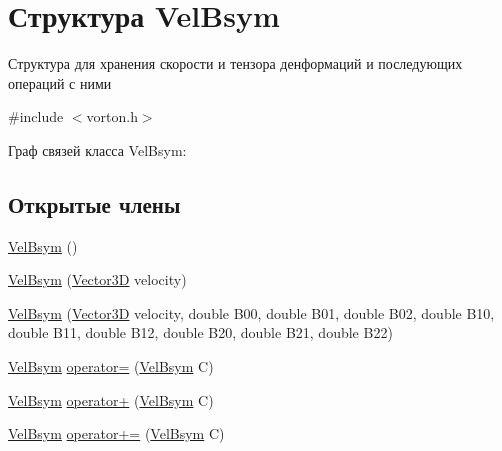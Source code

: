 \hypertarget{struct_vel_bsym}{}\section{Структура Vel\+Bsym}
\label{struct_vel_bsym}


Структура для хранения скорости и тензора денформаций и последующих операций с ними  




{\ttfamily \#include $<$vorton.\+h$>$}



Граф связей класса Vel\+Bsym\+:
\subsection*{Открытые члены}
\begin{DoxyCompactItemize}
\item 
\mbox{\hyperlink{struct_vel_bsym_ab6d789ff036824176fd982ec3650d762}{Vel\+Bsym}} ()
\item 
\mbox{\hyperlink{struct_vel_bsym_ade5b269a7530d543b14c273249cff251}{Vel\+Bsym}} (\mbox{\hyperlink{class_vector3_d}{Vector3D}} velocity)
\item 
\mbox{\hyperlink{struct_vel_bsym_a9d1a6ce0827c575a9bb137a0ffd8fc20}{Vel\+Bsym}} (\mbox{\hyperlink{class_vector3_d}{Vector3D}} velocity, double B00, double B01, double B02, double B10, double B11, double B12, double B20, double B21, double B22)
\item 
\mbox{\hyperlink{struct_vel_bsym}{Vel\+Bsym}} \mbox{\hyperlink{struct_vel_bsym_aad5b2c52f958cbb6457564d654e17566}{operator=}} (\mbox{\hyperlink{struct_vel_bsym}{Vel\+Bsym}} C)
\item 
\mbox{\hyperlink{struct_vel_bsym}{Vel\+Bsym}} \mbox{\hyperlink{struct_vel_bsym_a4751cccf35691a5793f7b181a047b1c3}{operator+}} (\mbox{\hyperlink{struct_vel_bsym}{Vel\+Bsym}} C)
\item 
\mbox{\hyperlink{struct_vel_bsym}{Vel\+Bsym}} \mbox{\hyperlink{struct_vel_bsym_a78c32398d1f814ad59b0259e7ab8728e}{operator+=}} (\mbox{\hyperlink{struct_vel_bsym}{Vel\+Bsym}} C)
\end{DoxyCompactItemize}
